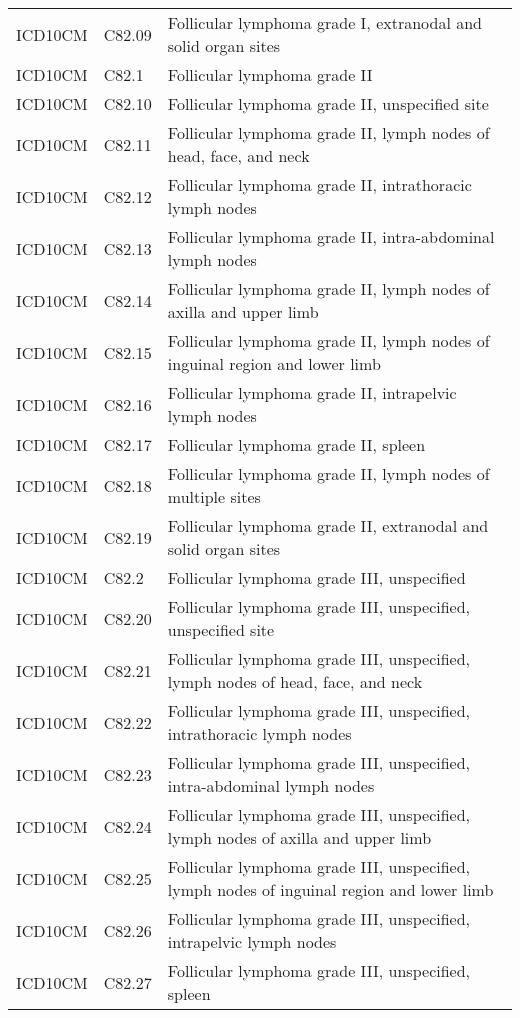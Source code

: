 \begin{longtable}{p{}p{}p{}}
  ICD10CM & C82.09 & Follicular lymphoma grade I, extranodal and solid organ sites \\ 
  ICD10CM & C82.1 & Follicular lymphoma grade II \\ 
  ICD10CM & C82.10 & Follicular lymphoma grade II, unspecified site \\ 
  ICD10CM & C82.11 & Follicular lymphoma grade II, lymph nodes of head, face, and neck \\ 
  ICD10CM & C82.12 & Follicular lymphoma grade II, intrathoracic lymph nodes \\ 
  ICD10CM & C82.13 & Follicular lymphoma grade II, intra-abdominal lymph nodes \\ 
  ICD10CM & C82.14 & Follicular lymphoma grade II, lymph nodes of axilla and upper limb \\ 
  ICD10CM & C82.15 & Follicular lymphoma grade II, lymph nodes of inguinal region and lower limb \\ 
  ICD10CM & C82.16 & Follicular lymphoma grade II, intrapelvic lymph nodes \\ 
  ICD10CM & C82.17 & Follicular lymphoma grade II, spleen \\ 
  ICD10CM & C82.18 & Follicular lymphoma grade II, lymph nodes of multiple sites \\ 
  ICD10CM & C82.19 & Follicular lymphoma grade II, extranodal and solid organ sites \\ 
  ICD10CM & C82.2 & Follicular lymphoma grade III, unspecified \\ 
  ICD10CM & C82.20 & Follicular lymphoma grade III, unspecified, unspecified site \\ 
  ICD10CM & C82.21 & Follicular lymphoma grade III, unspecified, lymph nodes of head, face, and neck \\ 
  ICD10CM & C82.22 & Follicular lymphoma grade III, unspecified, intrathoracic lymph nodes \\ 
  ICD10CM & C82.23 & Follicular lymphoma grade III, unspecified, intra-abdominal lymph nodes \\ 
  ICD10CM & C82.24 & Follicular lymphoma grade III, unspecified, lymph nodes of axilla and upper limb \\ 
  ICD10CM & C82.25 & Follicular lymphoma grade III, unspecified, lymph nodes of inguinal region and lower limb \\ 
  ICD10CM & C82.26 & Follicular lymphoma grade III, unspecified, intrapelvic lymph nodes \\ 
  ICD10CM & C82.27 & Follicular lymphoma grade III, unspecified, spleen \\ 

\end{longtable}

